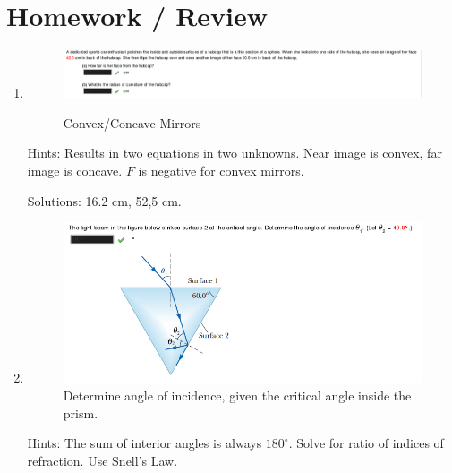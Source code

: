 \documentclass[a4paper,10pt]{report}
\begin{document}
\section{Homework / Review}
\begin{enumerate}

  \item
    \begin{figure}[h!]
    \begin{centering}
    \begin{center}
    \includegraphics[width=\linewidth]{./Images/hw5.png}
    \label{fig:hw_concave_convex}
    \caption{Convex/Concave Mirrors}
    \end{center}
    \par\end{centering}
    \end{figure}
  Hints: Results in two equations in two unknowns. Near image is convex, far image is concave. $F$ is negative for convex mirrors.

  Solutions: 16.2 cm, 52,5 cm.

  \item
    \begin{figure}[h!]
    \begin{centering}
    \begin{center}
    \includegraphics[width=\linewidth]{./Images/prism.png}
    \caption{Determine angle of incidence, given the critical angle inside the prism.}
    \end{center}
    \par\end{centering}
    \end{figure}
  Hints: The sum of interior angles is always $180^{\circ}$. Solve for ratio of indices of refraction. Use Snell's Law.


\end{enumerate}
\end{document}
